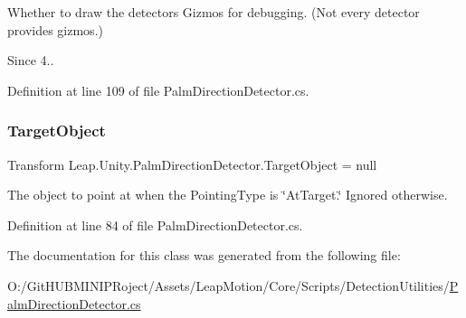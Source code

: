 Whether to draw the detector\textquotesingle{}s Gizmos for debugging. (Not every detector provides gizmos.) \begin{DoxySince}{Since}
4.. 
\end{DoxySince}


Definition at line 109 of file Palm\+Direction\+Detector.\+cs.

\mbox{\label{class_leap_1_1_unity_1_1_palm_direction_detector_adbf98d8c7989d572784c00c28cd4cf97}} 
\subsubsection{\texorpdfstring{TargetObject}{TargetObject}}
{\footnotesize\ttfamily Transform Leap.\+Unity.\+Palm\+Direction\+Detector.\+Target\+Object = null}

The object to point at when the Pointing\+Type is \char`\"{}\+At\+Target.\char`\"{} Ignored otherwise. 

Definition at line 84 of file Palm\+Direction\+Detector.\+cs.



The documentation for this class was generated from the following file\+:\begin{DoxyCompactItemize}
\item 
O\+:/\+Git\+H\+U\+B\+M\+I\+N\+I\+P\+Roject/\+Assets/\+Leap\+Motion/\+Core/\+Scripts/\+Detection\+Utilities/\mbox{\hyperlink{_palm_direction_detector_8cs}{Palm\+Direction\+Detector.\+cs}}\end{DoxyCompactItemize}
